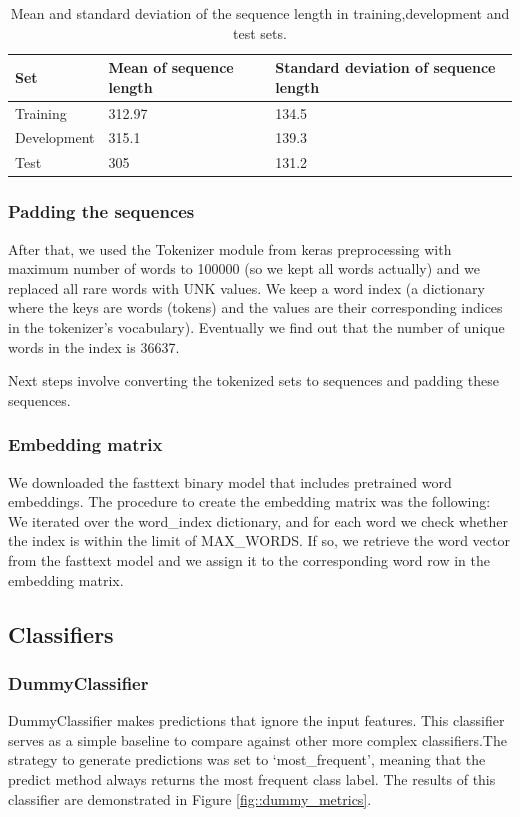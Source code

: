 \documentclass[10pt, a4paper]{article}
\begin{document}
 	\begin{table}
		\begin{tabular}{|l|l|l|}
			\hline
			\cellcolor{blue!25}\textbf{Set} & \cellcolor{blue!25}\textbf{Mean of sequence length} &
			\cellcolor{blue!25}\textbf{Standard deviation of sequence length}\\
			\hline
			Training & 312.97 & 134.5 \\\hline
			Development & 315.1  & 139.3 \\\hline
			Test & 305 & 131.2 \\\hline
		\end{tabular}
		\centering
		\caption{Mean and standard deviation of the sequence length in training,development and test sets.}
		\label{tab::ex-1-stats}
	\end{table}
	
	
	
	\subsubsection{Padding the sequences}
	After that, we used the Tokenizer module from keras preprocessing with maximum number of words to 100000 (so we kept all words actually) and we replaced all rare words with UNK values. We keep a word index (a dictionary where the keys are words (tokens) and the values are their corresponding indices in the tokenizer's vocabulary). Eventually we find out that the number of unique words in the index is 36637.
 
    Next steps involve converting the tokenized sets to sequences and padding these sequences.

    \subsubsection{Embedding matrix}
     We downloaded the fasttext binary model that includes pretrained word embeddings. The procedure to create the embedding matrix was the following: We iterated over the word\_index dictionary, and for each word we check whether the index is within the limit of MAX\_WORDS. If so, we retrieve the word vector from the fasttext model and we assign it to the corresponding word row in the embedding matrix.
    
	
	\subsection{Classifiers}
	\subsubsection{DummyClassifier}
	DummyClassifier makes predictions that ignore the input features. This classifier serves as a simple baseline to compare against other more complex classifiers.The strategy to generate predictions was set to ‘most\_frequent’,  meaning that the predict method always returns the most frequent class label. The results of this classifier are demonstrated in Figure \ref{fig::dummy_metrics}.
	
\end{document}
